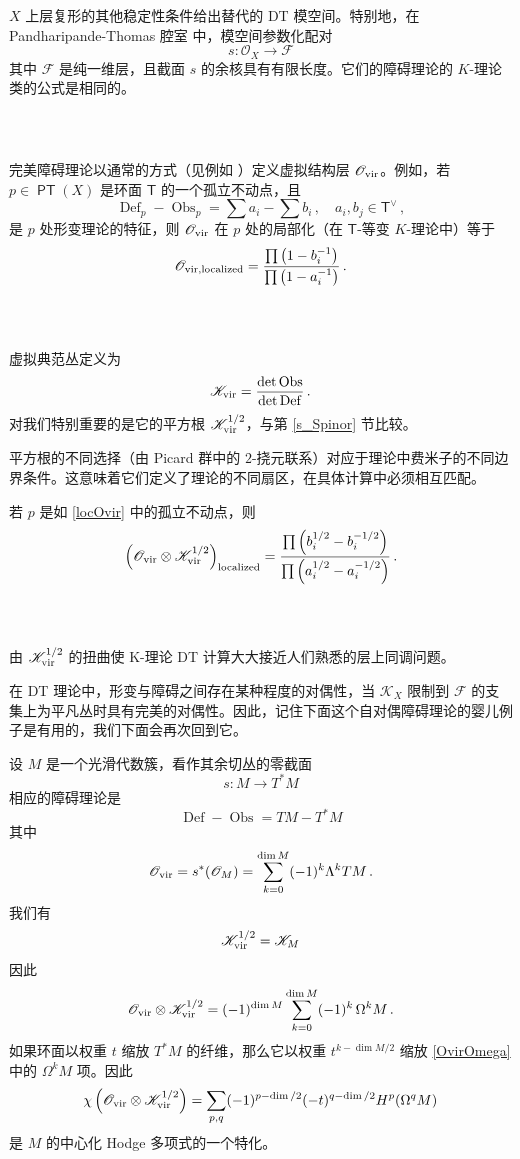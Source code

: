 \documentclass[12pt]{article}
\newcommand{\cO}{\mathscr{O}}
\newcommand{\Ovir}{\mathscr{O}_{\textup{vir}}}
\newcommand{\Kvir}{\mathscr{K}_{\textup{vir}}}
\DeclareMathOperator{\Def}{Def}
\DeclareMathOperator{\Obs}{Obs}
\DeclareMathOperator{\PT}{\mathsf{PT}}
\newcommand{\cF}{\mathscr{F}}
\newcommand{\bT}{\mathsf{T}}
\newcommand{\cK}{\mathscr{K}}
\theoremstyle{definition}
\begin{document}
$X$ 上层复形的其他稳定性条件给出替代的 DT 模空间。特别地，在 Pandharipande-Thomas 腔室 \cite{PT} 中，模空间参数化配对
$$
s: \cO_X \to \cF
$$
其中 $\cF$ 是纯一维层，且截面 $s$ 的余核具有有限长度。它们的障碍理论的 $K$-理论类的公式是相同的。

\subsubsection{\ }

完美障碍理论以通常的方式（见例如 \cite{FG}）定义虚拟结构层 $\Ovir$。例如，若 $p\in \PT(X)$ 是环面 $\bT$ 的一个孤立不动点，且
$$
\Def_p - \Obs_p = \sum a_i - \sum b_i \,, \quad a_i,b_j \in \bT^{\vee}\,,
$$
是 $p$ 处形变理论的特征，则 $\Ovir$ 在 $p$ 处的局部化（在 $\bT$-等变 $K$-理论中）等于
\begin{equation}
\cO_{\textup{vir},\textup{localized}} =
\frac{\prod \left(1-b_i^{-1}\right)}
{\prod \left(1-a_i^{-1}\right)}  \,.
\label{locOvir}
\end{equation}

\subsubsection{\ }

虚拟典范丛定义为
$$
\Kvir = \frac{\det \Obs}{\det \Def} \,.
$$
对我们特别重要的是它的平方根 $\Kvir^{1/2}$，与第 \ref{s_Spinor} 节比较。

平方根的不同选择（由 Picard 群中的 $2$-挠元联系）对应于理论中费米子的不同边界条件。这意味着它们定义了理论的不同扇区，在具体计算中必须相互匹配。

若 $p$ 是如 \eqref{locOvir} 中的孤立不动点，则
\begin{equation}
\left(\Ovir \otimes \Kvir^{1/2} \right)_{\textup{localized}} =
\frac{\prod \left(b_i^{1/2}-b_i^{-1/2}
\right)}{\prod \left(a_i^{1/2}-a_i^{-1/2}\right)}  \,.
\label{locKvir}
\end{equation}

\subsubsection{\ }\label{s_Hodge}
由 $\Kvir^{1/2}$ 的扭曲使 K-理论 DT 计算大大接近人们熟悉的层上同调问题。

在 DT 理论中，形变与障碍之间存在某种程度的对偶性，当 $\cK_X$ 限制到 $\cF$ 的支集上为平凡丛时具有完美的对偶性。因此，记住下面这个自对偶障碍理论的婴儿例子是有用的，我们下面会再次回到它。

设 $M$ 是一个光滑代数簇，看作其余切丛的零截面
$$
s: M \to T^*M
$$
相应的障碍理论是
$$
\Def - \Obs = TM - T^*M
$$
其中
$$
\Ovir = s^*(\cO_M) = \sum_{k=0}^{\dim M} (-1)^k \Lambda^k TM \,.
$$
我们有
$$
\Kvir^{1/2} = \cK_M
$$
因此
\begin{equation}
\Ovir \otimes \Kvir^{1/2} = (-1)^{\dim M}
\sum_{k=0}^{\dim M} (-1)^k \, \Omega^k M \,.
\label{OvirOmega}
\end{equation}
如果环面以权重 $t$ 缩放 $T^*M$ 的纤维，那么它以权重 $t^{k-\dim M/2}$ 缩放 \eqref{OvirOmega} 中的 $\Omega^k M$ 项。因此
$$
\chi \left(\Ovir \otimes \Kvir^{1/2}\right) =
\sum_{p,q} (-1)^{p-\dim/2} (-t)^{q-\dim/2} H^p(\Omega^q M)
$$
是 $M$ 的中心化 Hodge 多项式的一个特化。
\end{document}
